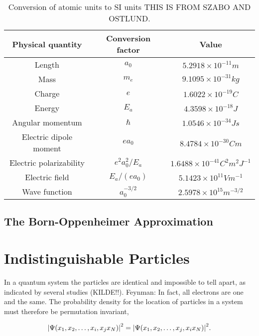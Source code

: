         \begin{table}
            \centering
            \caption{Conversion of atomic units to SI units THIS IS FROM SZABO AND OSTLUND.}
            \begin{tabular}{ccc} \hline
                Physical quantity & Conversion factor & Value \\ \hline
                Length  & $a_0$ & $5.2918 \times 10^{-11} m$ \\
                Mass    & $m_e$ & $9.1095 \times 10^{-31} kg$ \\
                Charge  & $e$   & $1.6022 \times 10^{-19} C$ \\
                Energy  & $E_a$ & $4.3598 \times 10^{-18} J$ \\
                Angular momentum & $\hbar$ &  $1.0546 \times 10^{-34} Js$ \\
                Electric dipole moment & $ea_0$& $8.4784 \times 10^{-30} Cm$ \\
                Electric polarizability & $e^2a_0^2/E_a$ & $1.6488 \times 10^{-41} C^2m^2J^{-1}$ \\
                Electric field & $E_a/(ea_0)$ & $5.1423 \times 10^{11} Vm^{-1} $ \\
                Wave function & $a_0^{-3/2}$ & $2.5978 \times 10^{15} m^{-3/2}$ \\ \hline
            \end{tabular}
            \label{tab:atomic_units_conversion}
        \end{table}

    \subsection{The Born-Oppenheimer Approximation}



\section{Indistinguishable Particles}

    In a quantum system the particles are identical and impossible to tell
    apart, as indicated by several studies (KILDE!!). 
    Feynman: In fact, all electrons are one and the same.
    The probability density
    for the location of particles in a system must therefore be permutation
    invariant,

    \begin{equation}
        \abs{\Psi(x_1, x_2, \dots, x_i, x_j x_N)}^2 
        = 
        \abs{\Psi(x_1, x_2, \dots, x_j, x_i x_N)}^2.
    \end{equation}

